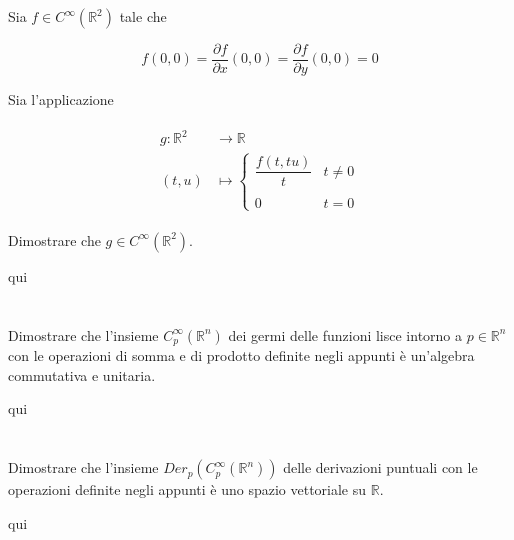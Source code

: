 \begin{tcolorbox}
	Sia $ f \in C^{\infty}(\mathbb{R}^{2}) $ tale che
	
	\begin{equation}
		f(0,0) = \dfrac{\partial f}{\partial x} (0,0) = \dfrac{\partial f}{\partial y} (0,0) = 0
	\end{equation}

	Sia l'applicazione
	
	\begin{align}
		\begin{split}
			g : \mathbb{R}^{2} & \to \mathbb{R}\\
			(t,u) &\mapsto%
			\begin{cases}
				\dfrac{f(t,tu)}{t} & t \neq 0\\\\
				0 & t = 0
			\end{cases}
		\end{split}
	\end{align}
	
	Dimostrare che $ g \in C^{\infty}(\mathbb{R}^{2}) $.
\end{tcolorbox}

qui

\section{}\label{es1-7}

\begin{tcolorbox}
	Dimostrare che l'insieme $ C_{p}^{\infty}(\mathbb{R}^{n}) $ dei germi delle funzioni lisce intorno a $ p \in \mathbb{R}^{n} $ con le operazioni di somma e di prodotto definite negli appunti è un'algebra commutativa e unitaria.
\end{tcolorbox}

qui

\section{}\label{es1-8}

\begin{tcolorbox}
	Dimostrare che l'insieme $ Der_{p}(C_{p}^{\infty}(\mathbb{R}^{n})) $ delle derivazioni puntuali con le operazioni definite negli appunti è uno spazio vettoriale su $ \mathbb{R} $.
\end{tcolorbox}

qui

\section{}\label{es1-9}

